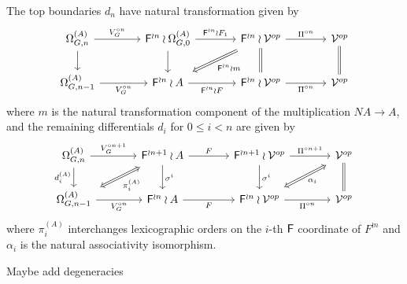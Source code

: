 \documentclass[a4paper,10pt]{article}%
\begin{document}
The top boundaries $d_n$ have natural transformation given by
\begin{equation}
	\begin{tikzcd}[column sep=3.7em]
	\Omega_{G,n}^{(A)} \ar{d} \ar{r}{V_G^{\circ n}} &
	\Fin^{\wr n} \wr \Omega_{G,0}^{(A)} \ar{r}{\Fin^{\wr n}\wr F_1} \ar{d}&
	|[alias=dog2]|
	\Fin^{\wr n} \wr \mathcal{V}^{op} \ar{r}{\Pi^{\circ n}}  \ar[equal]{d} &
	\mathcal{V}^{op} \ar[equal]{d}
\\
	\Omega_{G,n-1}^{(A)} \ar{r}[swap]{V_G^{\circ n}} &
	|[alias=cat3]|
	\Fin^{\wr n} \wr A \ar{r}[swap]{\Fin^{\wr n} \wr F} &
	\Fin^{\wr n} \wr \mathcal{V}^{op} \ar{r}[swap]{\Pi^{\circ n}} &
	|[alias=dog]|
	\mathcal{V}^{op}
	\arrow[Rightarrow, from=dog2, to=cat3,shorten <=0.15cm,,shorten >=0.15cm,"\Fin^{\wr n} \wr m"]
	\end{tikzcd}
\end{equation}
where $m$ is the natural transformation component of the multiplication $NA \to A$, and the remaining differentials
$d_i$ for $0 \leq i < n$ are given by
\begin{equation}\label{REMAINDIFF EQ}
	\begin{tikzcd}[column sep=3.7em]
	\Omega_{G,n}^{(A)} \ar{d}[swap]{d_i^{(A)}} \ar{r}{V_G^{\circ n + 1}} &
	|[alias=dog2]|
	\Fin^{\wr n+1} \wr A \ar{r}{F} \ar{d}{\sigma^i}&
	\Fin^{\wr n+1} \wr \mathcal{V}^{op} \ar{r}{\Pi^{\circ n+1}}  \ar{d}{\sigma^i} &
	|[alias=dog3]|
	\mathcal{V}^{op} \ar[equal]{d}
\\
	|[alias=cat2]|
	\Omega_{G,n-1}^{(A)} \ar{r}[swap]{V_G^{\circ n}} &
	\Fin^{\wr n} \wr A \ar{r}[swap]{F} &
	|[alias=cat3]|
	\Fin^{\wr n} \wr \mathcal{V}^{op} \ar{r}[swap]{\Pi^{\circ n}} &
	|[alias=dog]|
	\mathcal{V}^{op}
	\arrow[Leftrightarrow, from=dog2, to=cat2,shorten <=0.15cm,,shorten >=0.15cm,"\pi_i^{(A)}"]
	\arrow[Leftrightarrow, from=dog3, to=cat3,shorten <=0.15cm,,shorten >=0.15cm,"\alpha_i"]
	\end{tikzcd}
\end{equation}
where $\pi_i^{(A)}$ interchanges lexicographic orders on the $i$-th $\mathsf{F}$ coordinate of $F^{\wr n}$ and $\alpha_i$ is the natural associativity isomorphism.

{\color{blue} Maybe add degeneracies}
\end{document}
